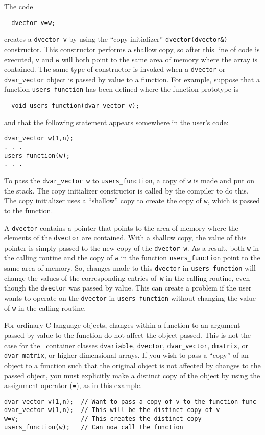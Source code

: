 \documentclass{admbmanual}
\begin{document}
The code
\begin{lstlisting}
  dvector v=w;
\end{lstlisting}
 creates a \texttt{dvector v} 
by using  the ``copy initializer'' 
\texttt{dvector(dvector\&)} 
constructor. This constructor performs a shallow copy, so 
after this line of code is executed, \texttt{v} and \texttt{w} will
both point to the same area of memory where the array is contained.
The same type of constructor is 
invoked when a \texttt{dvector} or 
\texttt{dvar\_vector} object is passed by value
to a function. For example, suppose that a function \texttt{users\_function}
has been defined where the function prototype is
\begin{lstlisting}
  void users_function(dvar_vector v);
\end{lstlisting}
and that the following statement appears somewhere in the user's code:
\begin{lstlisting}
dvar_vector w(1,n);
. . .
users_function(w);
. . .
\end{lstlisting}

To pass the \texttt{dvar\_vector w} to \texttt{users\_function}, a copy of
\texttt{w} is made and put on the stack. The copy initializer constructor
is called by the compiler to do this. 
The copy initializer uses a ``shallow'' copy to
create the copy of \texttt{w}, which is passed to the function.

A \texttt{dvector} contains a pointer that points to the area of memory
where the elements of the \texttt{dvector} are contained. With a shallow
copy, the value of this pointer is simply passed to the new copy of
the \texttt{dvector w}. As a result, both \texttt{w} in the calling routine
and the copy of \texttt{w} in the function \texttt{users\_function} 
point to the same area of memory.  So, changes made to
this \texttt{dvector} in \texttt{users\_function} will change the values of
the corresponding entries of~\texttt{w} in the calling routine, even
though the \texttt{dvector} was passed by value. This can create a
problem if the user wants to operate on the \texttt{dvector} in 
\texttt{users\_function} without changing the value of \texttt{w} in the
calling routine. 

For ordinary C language objects,  
changes within a function to an argument passed by value to the
 function do not affect the object passed.  This is not the case
for the \scAD\ container classes \texttt{dvariable}, \texttt{dvector}, \texttt{dvar\_vector}, \texttt{dmatrix},
or \texttt{dvar\_matrix}, or higher-dimensional arrays. 
If you wish to pass a ``copy'' of an object to a function
such that the original object is not affected by changes to the
passed object, you must explicitly make a distinct copy of the object
by using the assignment operator (\texttt{=}), as in this example.
\begin{lstlisting}
dvar_vector v(1,n);  // Want to pass a copy of v to the function func
dvar_vector w(1,n);  // This will be the distinct copy of v
w=v;                 // This creates the distinct copy
users_function(w);   // Can now call the function
\end{lstlisting}
\end{document}
